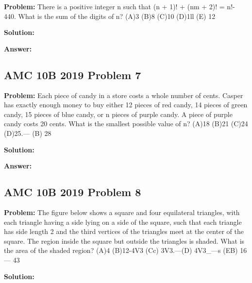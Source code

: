 \documentclass{article}
\newenvironment{problem}{\textbf{Problem: }}{\\}
\newenvironment{solution}{\textbf{Solution: }}{\\}
\newenvironment{answer}{\textbf{Answer: }}{\\}
\begin{document}
\begin{problem}
There is a positive integer n such that (n + 1)! + (nm + 2)! = n!- 440. What is the sum of the digits of n? (A)3 (B)8 (C)10 (D)1ll (E) 12
\end{problem}

\begin{solution}
\end{solution}

\begin{answer}
\end{answer}

\subsection{AMC 10B 2019 Problem 7}

\begin{problem}
Each piece of candy in a store costs a whole number of cents. Casper has exactly enough money to buy either 12 pieces of red candy, 14 pieces of green candy, 15 pieces of blue candy, or n pieces of purple candy. A piece of purple candy costs 20 cents. What is the smallest possible value of n? (A)18 (B)21 (C)24 (D)25.— (B) 28
\end{problem}

\begin{solution}
\end{solution}

\begin{answer}
\end{answer}

\subsection{AMC 10B 2019 Problem 8}

\begin{problem}
The figure below shows a square and four equilateral triangles, with each triangle having a side lying on a side of the square, such that each triangle has side length 2 and the third vertices of the triangles meet at the center of the square. The region inside the square but outside the triangles is shaded. What is the area of the shaded region? (A)4 (B)12-4V3 (Cc) 3V3.—(D) 4V3_—s (EB) 16 — 43
\end{problem}

\begin{solution}
\end{solution}
\end{document}
